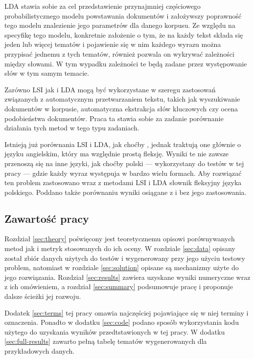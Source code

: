\documentclass[11pt,a4paper]{article}
\begin{document}
LDA stawia sobie za cel przedstawienie przynajmniej częściowego
probabilistycznego modelu powstawania dokumentów i założywszy poprawność tego
modelu znalezienie jego parametrów dla danego korpusu. Ze względu na specyfikę
tego modelu, konkretnie założenie o tym, że na każdy tekst składa się jeden lub
więcej tematów i pojawienie się w nim każdego wyrazu można przypisać jednemu z
tych tematów, również pozwala on wykrywać zależności między słowami. W tym
wypadku zależności te będą zadane przez występowanie słów w tym samym temacie.

Zarówno LSI jak i LDA mogą być wykorzystane w szeregu zastosowań związanych z
automatycznym przetwarzaniem tekstu, takich jak wyszukiwanie dokumentów w
korpusie, automatyczna ekstrakcja słów kluczowych czy ocena podobieństwa
dokumentów. Praca ta stawia sobie za zadanie porównanie działania tych metod
w tego typu zadaniach.

Istnieją już porównania LSI i LDA, jak choćby \cite{lda-paper}, jednak traktują
one głównie o języku angielskim, który ma względnie prostą fleksję. Wyniki te
nie zawsze przenoszą się na inne języki, jak choćby polski --- wykorzystany do
testów w tej pracy --- gdzie każdy wyraz występuja w bardzo wielu formach. Aby
rozwiązać ten problem zastosowano wraz z metodami LSI i LDA słownik fleksyjny
języka polskiego. Poddano także porównaniu wyniki osiągane z i bez jego
zastosowania.

\subsection{Zawartość pracy}

Rozdział \ref{sec:theory} poświęcony jest teoretycznemu opisowi porównywanych
metod jak i metryk stosowanych do ich oceny. W rozdziale \ref{sec:data} opisany
został zbiór danych użytych do testów i wygenerowany przy jego użyciu testowy
problem, natomiast w rozdziale \ref{sec:solution} opisane są mechanizmy użyte
do jego rozwiązania. Rozdział \ref{sec:results} zawiera uzyskane wyniki
numeryczne wraz z ich omówieniem, a rozdział \ref{sec:summary} podsumowuje
pracę i proponuje dalsze ścieżki jej rozwoju.

Dodatek \ref{sec:terms} tej pracy omawia najczęściej pojawiające się w niej
terminy i oznaczenia.  Ponadto w dodatku \ref{sec:code} podano sposób
wykorzystania kodu użytego do uzyskania wyników przedtstawionych w tej pracy. W
dodatku \ref{sec:full-results} zawarto pełną tabelę tematów wygenerowanych
dla przykładowych danych.
\end{document}
